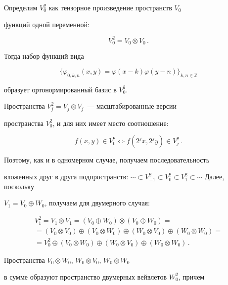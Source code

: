 Определим $V_0^2$ как тензорное произведение пространств $V_0$

функций одной переменной:

$$

    V_0^2=V_0 \otimes V_0\,.

$$



Тогда набор функций вида

\begin{equation*}

    \{\varphi_{0,k,n}(x,y)=\varphi(x-k)\varphi(y-n)\}_{k,n \in \mathbb{Z}}

\end{equation*}

образует ортонормированный базис в $V_0^2$.



Пространства $V_j^2=V_j \otimes V_j$~--- масштабированные версии

пространства $V_0^2$, и для них имеет место соотношение:

$$

    f(x,y) \in V_0^2 \iff f(2^jx,2^jy) \in V_j^2\,.

$$

%

Поэтому, как и в одномерном случае, получаем последовательность

вложенных друг в друга подпространств: $\cdots \subset V_{-1}^2

\subset V_0^2 \subset V_1^2 \subset \cdots$ Далее, поскольку

$V_1=V_0 \oplus W_0$, получаем для двумерного случая:

\begin{multline*}

    V_1^2 = V_1 \otimes V_1 = (V_0 \oplus W_0) \otimes (V_0 \oplus W_0) = {}\\

{}    =(V_0 \otimes V_0) \oplus (V_0 \otimes W_0) \oplus (W_0 \otimes V_0) \oplus (W_0 \otimes W_0)={}\\

  {}  =V_0^2 \oplus (V_0 \otimes W_0) \oplus (W_0 \otimes V_0) \oplus (W_0 \otimes W_0)\,.

\end{multline*}



Пространства $V_0 \otimes W_0$, $W_0 \otimes V_0$, $W_0 \otimes W_0$

в сумме образуют пространство двумерных вейвлетов $W_0^2$, причем

